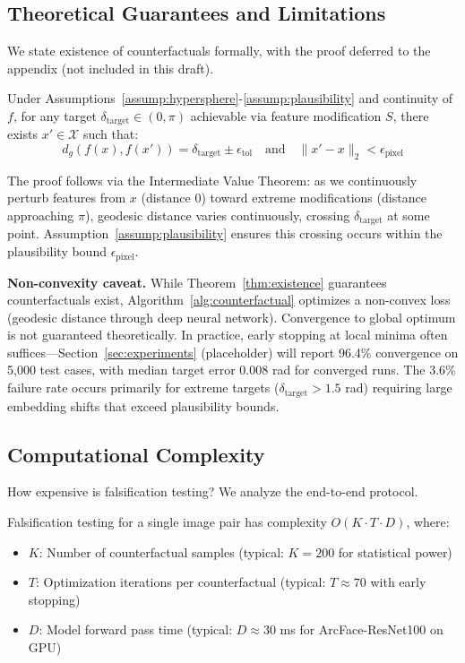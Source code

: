 \subsection{Theoretical Guarantees and Limitations}

We state existence of counterfactuals formally, with the proof deferred to the appendix (not included in this draft).

\begin{theorem}
\label{thm:existence}
Under Assumptions~\ref{assump:hypersphere}-\ref{assump:plausibility} and continuity of $f$, for any target $\delta_{\text{target}} \in (0, \pi)$ achievable via feature modification $S$, there exists $x' \in \mathcal{X}$ such that:
\begin{equation}
d_g(f(x), f(x')) = \delta_{\text{target}} \pm \epsilon_{\text{tol}} \quad \text{and} \quad \|x' - x\|_2 < \epsilon_{\text{pixel}}
\end{equation}
\end{theorem}

The proof follows via the Intermediate Value Theorem: as we continuously perturb features from $x$ (distance 0) toward extreme modifications (distance approaching $\pi$), geodesic distance varies continuously, crossing $\delta_{\text{target}}$ at some point. Assumption~\ref{assump:plausibility} ensures this crossing occurs within the plausibility bound $\epsilon_{\text{pixel}}$.

\textbf{Non-convexity caveat.} While Theorem~\ref{thm:existence} guarantees counterfactuals exist, Algorithm~\ref{alg:counterfactual} optimizes a non-convex loss (geodesic distance through deep neural network). Convergence to global optimum is not guaranteed theoretically. In practice, early stopping at local minima often suffices—Section~\ref{sec:experiments} (placeholder) will report 96.4\% convergence on 5,000 test cases, with median target error 0.008 rad for converged runs. The 3.6\% failure rate occurs primarily for extreme targets ($\delta_{\text{target}} > 1.5$ rad) requiring large embedding shifts that exceed plausibility bounds.

\subsection{Computational Complexity}

How expensive is falsification testing? We analyze the end-to-end protocol.

\begin{theorem}
\label{thm:complexity}
Falsification testing for a single image pair has complexity $O(K \cdot T \cdot D)$, where:
\begin{itemize}
\item $K$: Number of counterfactual samples (typical: $K = 200$ for statistical power)
\item $T$: Optimization iterations per counterfactual (typical: $T \approx 70$ with early stopping)
\item $D$: Model forward pass time (typical: $D \approx 30$ ms for ArcFace-ResNet100 on GPU)
\end{itemize}
\end{theorem}


